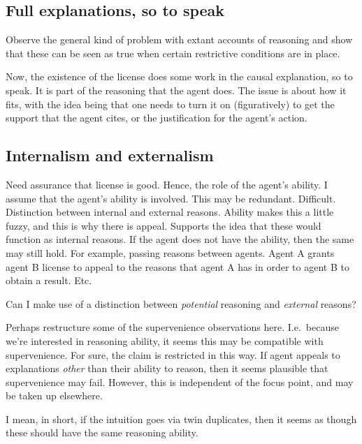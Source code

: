 \documentclass[10pt]{article}
\begin{document}
\subsection{Full explanations, so to speak}
\label{sec:full-explanations-so}

\begin{note}[Idea]
  Observe the general kind of problem with extant accounts of reasoning and show that these can be seen as true when certain restrictive conditions are in place.
\end{note}


\begin{note}[Generator]
  Now, the existence of the license does some work in the causal explanation, so to speak.
  It is part of the reasoning that the agent does.
  The issue is about how it fits, with the idea being that one needs to turn it on (figuratively) to get the support that the agent cites, or the justification for the agent's action.
\end{note}

\subsection{Internalism and externalism}
\label{sec:intern-extern}

\begin{note}[License]
  Need assurance that license is good.
  Hence, the role of the agent's ability.
  I assume that the agent's ability is involved.
  This may be redundant.
  Difficult.
  Distinction between internal and external reasons.
  Ability makes this a little fuzzy, and this is why there is appeal.
  Supports the idea that these would function as internal reasons.
  If the agent does not have the ability, then the same may still hold.
  For example, passing reasons between agents.
  Agent A grants agent B license to appeal to the reasons that agent A has in order to agent B to obtain a result.
  Etc.
\end{note}

\begin{note}[Maybe?]
  Can I make use of a distinction between \emph{potential} reasoning and \emph{external} reasons?
\end{note}

\begin{note}[Supervenience]
  Perhaps restructure some of the supervenience observations here.
  I.e.\ because we're interested in reasoning ability, it seems this may be compatible with supervenience.
  For sure, the claim is restricted in this way.
  If agent appeals to explanations \emph{other} than their ability to reason, then it seems plausible that supervenience may fail.
  However, this is independent of the focus point, and may be taken up elsewhere.

  I mean, in short, if the intuition goes via twin duplicates, then it seems as though these should have the same reasoning ability.
\end{note}
\end{document}
